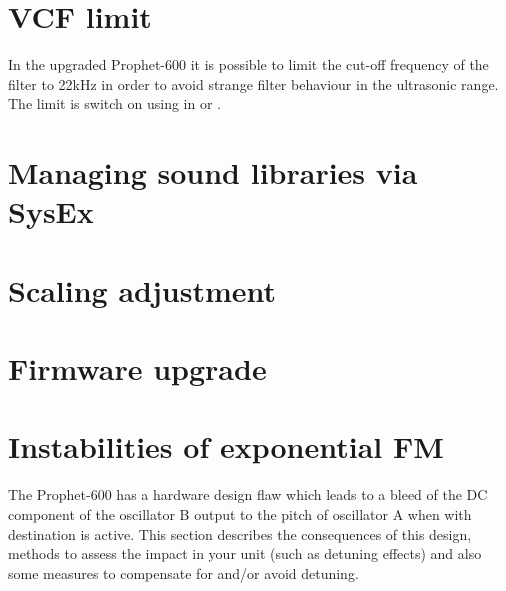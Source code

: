 \documentclass[landscape, 11pt, oneside, twoside]{report}
\newenvironment{flowtext}{\addmargin[0cm]{0cm}}{\endaddmargin} %
\begin{document}
\begin{flowtext}
\section{VCF limit}\label{limitsett}

In the upgraded Prophet-600 it is possible to limit the cut-off frequency of the filter to 22kHz in order to avoid strange filter behaviour in the ultrasonic range. The limit is switch on using  in \shiftmode or \shiftlock. 

\section{Managing sound libraries via SysEx}\label{patchmgmt}



\section{Scaling adjustment}\label{scalingadj}



\section{Firmware upgrade}\label{fwupgrade}

  

\section{Instabilities of exponential FM}\label{fm}

The Prophet-600 has a hardware design flaw which leads to a bleed of the DC component of the oscillator B output to the pitch of oscillator A when \polymodosc with destination \polymodfreq is active. This section describes the consequences of this design, methods to assess the impact in your unit (such as detuning effects) and also some measures to compensate for and/or avoid detuning.


\end{flowtext}
\end{document}

